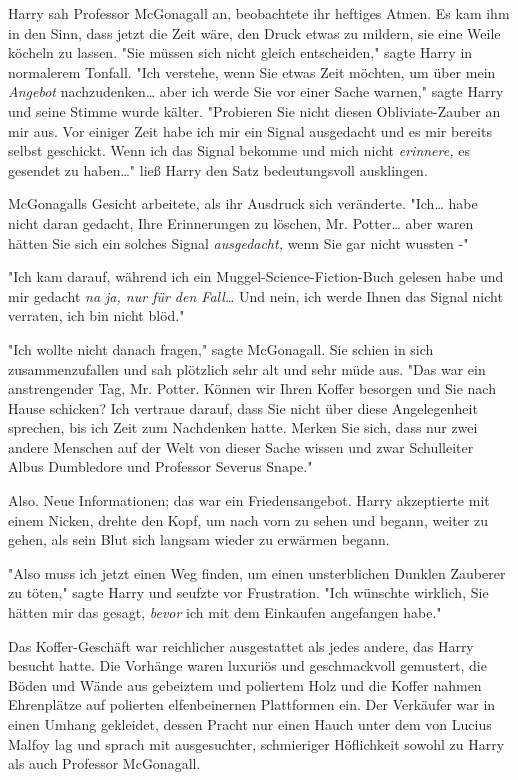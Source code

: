 {Harry sah Professor McGonagall an, beobachtete ihr heftiges Atmen. Es kam ihm in den Sinn, dass jetzt die Zeit wäre, den Druck etwas zu mildern, sie eine Weile köcheln zu lassen. "Sie müssen sich nicht gleich entscheiden," sagte Harry in normalerem Tonfall. "Ich verstehe, wenn Sie etwas Zeit möchten, um über mein \emph{Angebot} nachzudenken… aber ich werde Sie vor einer Sache warnen," sagte Harry und seine Stimme wurde kälter. "Probieren Sie nicht diesen Obliviate-Zauber an mir aus. Vor einiger Zeit habe ich mir ein Signal ausgedacht und es mir bereits selbst geschickt. Wenn ich das Signal bekomme und mich nicht \emph{erinnere,} es gesendet zu haben…" ließ Harry den Satz bedeutungsvoll ausklingen.

McGonagalls Gesicht arbeitete, als ihr Ausdruck sich veränderte. "Ich… habe nicht daran gedacht, Ihre Erinnerungen zu löschen, Mr. Potter… aber waren hätten Sie sich ein solches Signal \emph{ausgedacht,} wenn Sie gar nicht wussten -"

"Ich kam darauf, während ich ein Muggel-Science-Fiction-Buch gelesen habe und mir gedacht \emph{na ja, nur für den Fall…} Und nein, ich werde Ihnen das Signal nicht verraten, ich bin nicht blöd."

"Ich wollte nicht danach fragen," sagte McGonagall. Sie schien in sich zusammenzufallen und sah plötzlich sehr alt und sehr müde aus. "Das war ein anstrengender Tag, Mr. Potter. Können wir Ihren Koffer besorgen und Sie nach Hause schicken? Ich vertraue darauf, dass Sie nicht über diese Angelegenheit sprechen, bis ich Zeit zum Nachdenken hatte. Merken Sie sich, dass nur zwei andere Menschen auf der Welt von dieser Sache wissen und zwar Schulleiter Albus Dumbledore und Professor Severus Snape."

Also. Neue Informationen; das war ein Friedensangebot. Harry akzeptierte mit einem Nicken, drehte den Kopf, um nach vorn zu sehen und begann, weiter zu gehen, als sein Blut sich langsam wieder zu erwärmen begann.

"Also muss ich jetzt einen Weg finden, um einen unsterblichen Dunklen Zauberer zu töten," sagte Harry und seufzte vor Frustration. "Ich wünschte wirklich, Sie hätten mir das gesagt, \emph{bevor} ich mit dem Einkaufen angefangen habe."

\later

Das Koffer-Geschäft war reichlicher ausgestattet als jedes andere, das Harry besucht hatte. Die Vorhänge waren luxuriös und geschmackvoll gemustert, die Böden und Wände aus gebeiztem und poliertem Holz und die Koffer nahmen Ehrenplätze auf polierten elfenbeinernen Plattformen ein. Der Verkäufer war in einen Umhang gekleidet, dessen Pracht nur einen Hauch unter dem von Lucius Malfoy lag und sprach mit ausgesuchter, schmieriger Höflichkeit sowohl zu Harry als auch Professor McGonagall.

}
